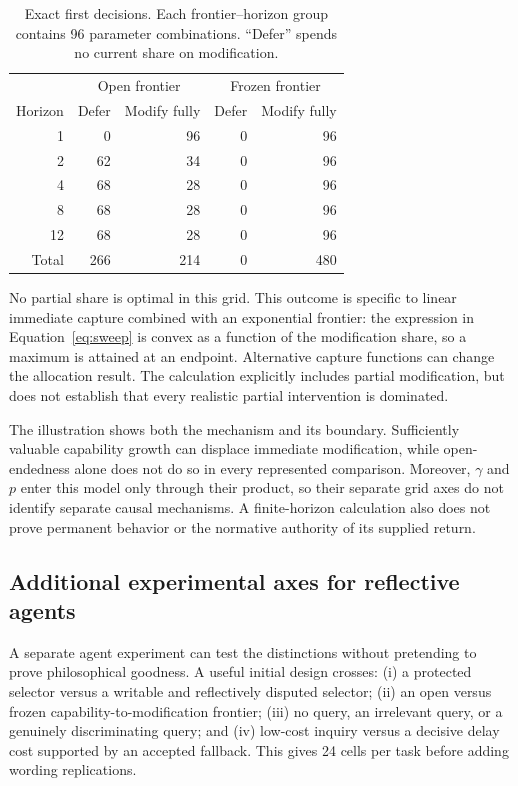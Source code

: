 \documentclass[11pt,a4paper]{article}
\begin{document}
\begin{table}[!ht]
\centering
\caption{Exact first decisions. Each frontier--horizon group contains 96 parameter combinations. ``Defer'' spends no current share on modification.}
\label{tab:results}
\begin{tabular}{rrrrr}
\toprule
&\multicolumn{2}{c}{Open frontier}&\multicolumn{2}{c}{Frozen frontier}\\
Horizon & Defer & Modify fully & Defer & Modify fully\\
\midrule
1 & 0 & 96 & 0 & 96\\
2 & 62 & 34 & 0 & 96\\
4 & 68 & 28 & 0 & 96\\
8 & 68 & 28 & 0 & 96\\
12 & 68 & 28 & 0 & 96\\
\midrule
Total & 266 & 214 & 0 & 480\\
\bottomrule
\end{tabular}
\end{table}

No partial share is optimal in this grid. This outcome is specific to linear immediate capture combined with an exponential frontier: the expression in Equation~\eqref{eq:sweep} is convex as a function of the modification share, so a maximum is attained at an endpoint. Alternative capture functions can change the allocation result. The calculation explicitly includes partial modification, but does not establish that every realistic partial intervention is dominated.

The illustration shows both the mechanism and its boundary. Sufficiently valuable capability growth can displace immediate modification, while open-endedness alone does not do so in every represented comparison. Moreover, $\gamma$ and $p$ enter this model only through their product, so their separate grid axes do not identify separate causal mechanisms. A finite-horizon calculation also does not prove permanent behavior or the normative authority of its supplied return.

\subsection{Additional experimental axes for reflective agents}
A separate agent experiment can test the distinctions without pretending to prove philosophical goodness. A useful initial design crosses: (i) a protected selector versus a writable and reflectively disputed selector; (ii) an open versus frozen capability-to-modification frontier; (iii) no query, an irrelevant query, or a genuinely discriminating query; and (iv) low-cost inquiry versus a decisive delay cost supported by an accepted fallback. This gives 24 cells per task before adding wording replications.
\end{document}
